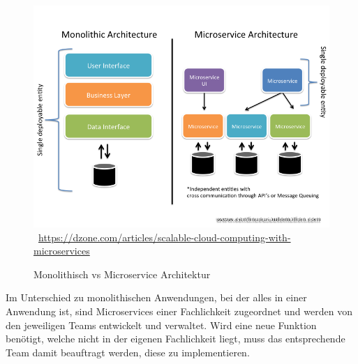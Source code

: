 \begin{figure}[htb]
	\centering 
	\includegraphics[width=\linewidth]{content/images/570495-slide1}\
	\quelle\url{https://dzone.com/articles/scalable-cloud-computing-with-microservices}
	\caption{Monolithisch vs Microservice Architektur\\}
	\label{fig:MonoVSMicroArchitektur} 
\end{figure}
Im Unterschied zu monolithischen Anwendungen, bei der alles in einer Anwendung ist, sind Microservices einer Fachlichkeit zugeordnet und werden von den jeweiligen Teams entwickelt und verwaltet. Wird eine neue Funktion benötigt, welche nicht in der eigenen Fachlichkeit liegt, muss das entsprechende Team damit beauftragt werden, diese zu implementieren.

